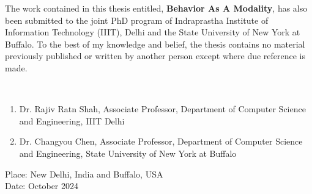 




\certificate

\vspace*{0.5in}

\noindent  The work contained in this thesis entitled, \textbf{Behavior As A Modality}, has also been submitted to the joint PhD program of Indraprastha Institute of Information Technology (IIIT), Delhi and the State University of New York at Buffalo. To the best of my knowledge and belief, the thesis contains no material previously published or written by another person except where due reference is made.

\vspace*{1.5in}

\begin{singlespacing}
{
 \\
\begin{enumerate}
    \item Dr. Rajiv Ratn Shah, Associate Professor, Department of Computer Science and Engineering, IIIT Delhi
    \item Dr. Changyou Chen, Associate Professor, Department of Computer Science and Engineering, State University of New York at Buffalo
\end{enumerate}

\noindent Place: New Delhi, India and Buffalo, USA\\
\noindent Date: October 2024
} 
\end{singlespacing}
\vspace*{0.25in}
